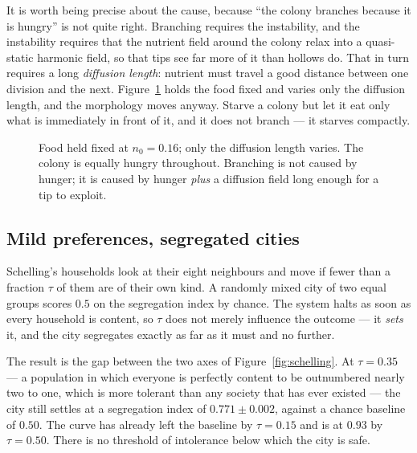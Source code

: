 \documentclass[11pt,a4paper]{article}
\begin{document}
It is worth being precise about the cause, because ``the colony branches because
it is hungry'' is not quite right. Branching requires the instability, and the
instability requires that the nutrient field around the colony relax into a
quasi-static harmonic field, so that tips see far more of it than hollows do.
That in turn requires a long \emph{diffusion length}: nutrient must travel a good
distance between one division and the next. Figure~\ref{fig:difflen} holds the
food fixed and varies only the diffusion length, and the morphology moves
anyway. Starve a colony but let it eat only what is immediately in front of it,
and it does not branch --- it starves compactly.

\begin{figure}[t]
\centering
{}
\caption{Food held fixed at $n_0=\num{0.16}$; only the diffusion length varies.
The colony is equally hungry throughout. Branching is not caused by hunger; it is
caused by hunger \emph{plus} a diffusion field long enough for a tip to exploit.}
\label{fig:difflen}
\end{figure}

\subsection{Mild preferences, segregated cities}

Schelling's households look at their eight neighbours and move if fewer than a
fraction $\tau$ of them are of their own kind. A randomly mixed city of two equal
groups scores $\num{0.5}$ on the segregation index by chance. The system halts as
soon as every household is content, so $\tau$ does not merely influence the
outcome --- it \emph{sets} it, and the city segregates exactly as far as it must
and no further.

The result is the gap between the two axes of Figure~\ref{fig:schelling}. At
$\tau=\num{0.35}$ --- a population in which everyone is perfectly content to be
outnumbered nearly two to one, which is more tolerant than any society that has
ever existed --- the city still settles at a segregation index of
$\num{0.771}\pm\num{0.002}$, against a chance baseline of $\num{0.50}$. The curve
has already left the baseline by $\tau=\num{0.15}$ and is at $\num{0.93}$ by
$\tau=\num{0.50}$. There is no threshold of intolerance below which the city is
safe.
\end{document}
